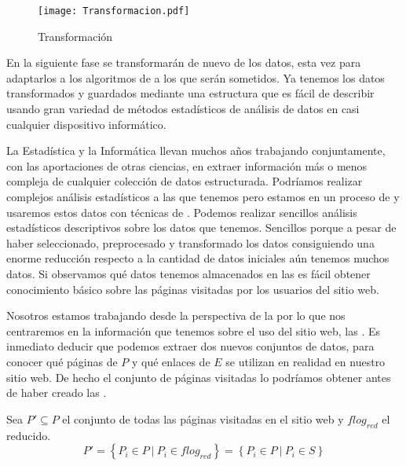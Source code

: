 \begin{wrapfigure}{o}{0.45\textwidth}
  \centering
  \texttt{[image: Transformacion.pdf]}
	\caption{Transformación}
	\label{fig:Transformacion}
\end{wrapfigure}
En la siguiente fase se transformarán de nuevo de los datos, esta vez para adaptarlos a los algoritmos de \dm a los que serán sometidos. Ya tenemos los datos transformados y guardados mediante una estructura que es fácil de describir usando gran variedad de métodos estadísticos de análisis de datos en casi cualquier dispositivo informático.

La Estadística y la Informática llevan muchos años trabajando conjuntamente, con las aportaciones de otras ciencias, en extraer información más o menos compleja de cualquier colección de datos estructurada. Podríamos realizar complejos análisis estadísticos a las \sns que tenemos pero estamos en un proceso de \wum y usaremos estos datos con técnicas de \dm. Podemos realizar sencillos análisis estadísticos descriptivos sobre los datos que tenemos. Sencillos porque a pesar de haber seleccionado, preprocesado y transformado los datos consiguiendo una enorme reducción respecto a la cantidad de datos iniciales aún tenemos muchos datos. Si observamos qué datos tenemos almacenados en las \sns es fácil obtener conocimiento básico sobre las páginas visitadas por los usuarios del sitio web.






Nosotros estamos trabajando desde la perspectiva de la \WUM por lo que nos centraremos en la información que tenemos sobre el uso del sitio web, las \sns. Es inmediato deducir que podemos extraer dos nuevos conjuntos de datos, para conocer qué páginas de $P$ y qué enlaces de $E$ se utilizan en realidad en nuestro sitio web. De hecho el conjunto de páginas visitadas lo podríamos obtener antes de haber creado las \sns.

\begin{Definition}\label{def:1-2-4-cjto-paginasVisitadasSW}
   Sea $P' \subseteq P$ el conjunto de todas las páginas visitadas en el sitio web y $flog_{red}$ el \flog reducido.
  \begin{equation}\label{eq:1-2-4-cjto-paginasVisitadasSW}
     P' = \left\{P_i \in P \ | \ P_i \in flog_{red}\right\} = \left\{P_i \in P \ | \ P_i \in S\right\}
  \end{equation}
\end{Definition}

